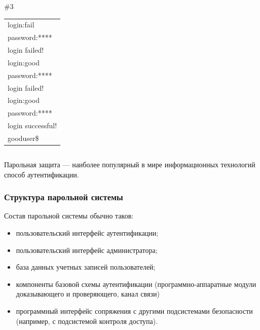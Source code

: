\begin{frame}
\begin{columns}
            \begin{block}{\#3}
                \begin{tabular}[c]{l}
                    login:\alert{fail}\\
                    password:\alert{****}\\
                    login failed!\\
                    login:\alert{good}\\
                    password:\alert{****}\\
                    login failed!\\
                    login:\alert{good}\\
                    password:\alert{****}\\
                    login successful!\\
                    gooduser\$
                \end{tabular}
            \end{block}
    \end{columns}
\end{frame}


Парольная защита --- наиболее популярный в мире информационных технологий способ аутентификации.


\begin{frame}
\frametitle{Структура парольной системы}
Состав парольной системы обычно таков:
\begin{itemize}
    \item пользовательский интерфейс аутентификации;
    \item пользовательский интерфейс администратора;
    
    \item база данных учетных записей пользователей;
    
    \item компоненты базовой схемы аутентификации (программно-аппаратные модули доказывающего и проверяющего, канал связи)
    \item программный интерфейс сопряжения с другими подсистемами безопасности (например, с подсистемой контроля доступа).
\end{itemize}
\end{frame}


